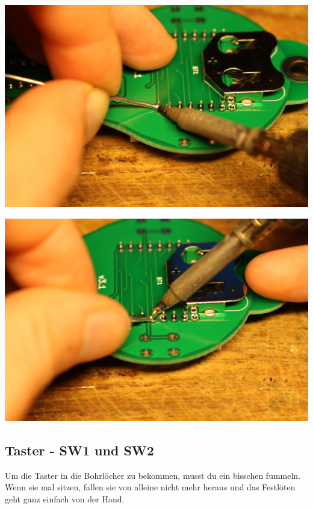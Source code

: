 \documentclass{article}
\begin{document}
\begin{minipage}[b]{0.5\textwidth}
	\includegraphics[width=\textwidth]{Bilder2021/IMG_8155.JPG}
\end{minipage}
\begin{minipage}[b]{0.5\textwidth}
	\includegraphics[width=\textwidth]{Bilder2021/IMG_8156.JPG}
\end{minipage}

\subsection{Taster - SW1 und SW2}

Um die Taster in die Bohrlöcher zu bekommen, musst du ein bisschen fummeln. Wenn sie mal sitzen, fallen sie von alleine nicht mehr heraus und das Festlöten geht ganz einfach von der Hand.
\end{document}
